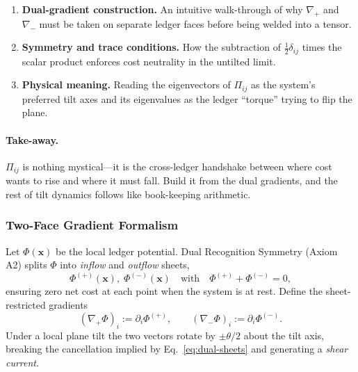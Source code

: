 \documentclass[11pt,oneside]{book}
\begin{document}
\begin{enumerate}[label=\arabic*.,leftmargin=*,itemsep=3pt]
\item \textbf{Dual-gradient construction.}  
      An intuitive walk-through of why \(\nabla_{+}\) and
      \(\nabla_{-}\) must be taken on separate ledger faces before
      being welded into a tensor.
\item \textbf{Symmetry and trace conditions.}  
      How the subtraction of \(\tfrac12\delta_{ij}\) times the scalar
      product enforces cost neutrality in the untilted limit.
\item \textbf{Physical meaning.}  
      Reading the eigenvectors of \(\Pi_{ij}\) as the system’s
      preferred tilt axes and its eigenvalues as the ledger “torque”
      trying to flip the plane.
\end{enumerate}

\paragraph{Take-away.}
\(\Pi_{ij}\) is nothing mystical—it is the cross-ledger handshake
between where cost wants to rise and where it must fall.  Build it
from the dual gradients, and the rest of tilt dynamics follows like
book-keeping arithmetic.



\subsubsection{Two-Face Gradient Formalism}
\label{ss:Pi-twoface-gradients}

Let $\Phi(\mathbf x)$ be the local ledger potential.
Dual Recognition Symmetry (Axiom A2) splits $\Phi$ into
\emph{inflow} and \emph{outflow} sheets,
\begin{equation}
   \Phi^{(+)}(\mathbf x),\;
   \Phi^{(-)}(\mathbf x)
   \quad\text{with}\quad
   \Phi^{(+)}+\Phi^{(-)} = 0,
   \label{eq:dual-sheets}
\end{equation}
ensuring zero net cost at each point when the system is at rest.
Define the sheet-restricted gradients
\[
   (\nabla_{+}\Phi)_{i} := \partial_{i}\Phi^{(+)},
   \qquad
   (\nabla_{-}\Phi)_{i} := \partial_{i}\Phi^{(-)}.
\]
Under a local plane tilt the two vectors rotate by
$\pm\theta/2$ about the tilt axis, breaking the cancellation implied by
Eq.~\eqref{eq:dual-sheets} and generating a \emph{shear current}.
\end{document}
